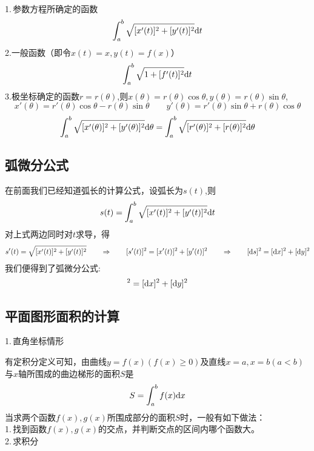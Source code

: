 \\ 1.$\,$参数方程所确定的函数
\begin{equation}
	\int_{a}^{b}\sqrt{[x'(t)]^2+[y'(t)]^2}{\rm{d}} t
\end{equation}
2.一般函数（即令$x(t)=x,y(t)=f(x)$）
\begin{equation}
	\int_{a}^{b}\sqrt{1+[f'(t)]^2}{\rm{d}} t
\end{equation}
3.极坐标确定的函数$r=r(\theta)$,则$x(\theta)=r(\theta)\cos \theta,y(\theta)=r(\theta)\sin\theta$,
\begin{equation}
	\nonumber
	x'(\theta)=r'(\theta)\cos \theta-r(\theta)\sin \theta \hspace{2em} y'(\theta)=r'(\theta)\sin \theta+r(\theta)\cos \theta
\end{equation}
\begin{equation}
	\int_{a}^{b}\sqrt{[x'(\theta)]^2+[y'(\theta)]^2}{\rm{d}} \theta=\int_{a}^{b}\sqrt{[r'(\theta)]^2+[r(\theta)]^2}{\rm{d}} \theta
\end{equation}
\subsection{弧微分公式}
在前面我们已经知道弧长的计算公式，设弧长为$s(t)$,则
\begin{equation}
	s(t)=\int_{a}^{b}\sqrt{[x'(t)]^2+[y'(t)]^2}{\rm{d}} t
\end{equation}
对上式两边同时对$t$求导，得
\begin{equation}
	s'(t)=\sqrt{[x'(t)]^2+[y'(t)]^2}\hspace*{2em} \Rightarrow \hspace{2em} [s'(t)]^2=[x'(t)]^2+[y'(t)]^2 \hspace*{2em} \Rightarrow  \hspace*{2em} [{\rm{d}} s]^2=[{\rm{d}} x]^2+[{\rm{d}} y]^2
\end{equation}
我们便得到了弧微分公式:
\begin{equation}
	[\d s]^2=[\d x]^2+[\d y]^2
\end{equation}
\subsection{平面图形面积的计算}
1.$\,$直角坐标情形
\par 有定积分定义可知，由曲线$y=f(x)(f(x)\geq 0)$及直线$x=a,x=b(a<b)$与$x$轴所围成的曲边梯形的面积$S$是
\begin{equation}
	S=\int_{a}^{b}f(x){\rm{d}} x
\end{equation}
当求两个函数$f(x),g(x)$所围成部分的面积$S$时，一般有如下做法：\\
1.$\,$找到函数$f(x),g(x)$的交点，并判断交点的区间内哪个函数大。\\
2.$\,$求积分
\begin{equation}
	
\end{equation}